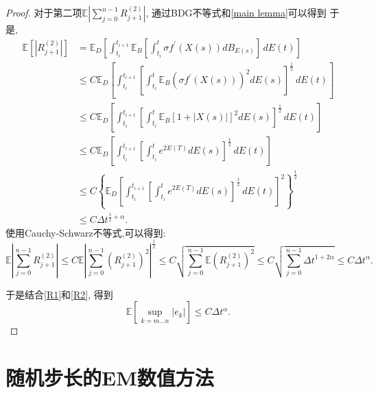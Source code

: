 \begin{proof}
	对于第二项$\mathbb{E}|\sum\limits_{j=0}^{n-1}R_{j+1}^{(2)}|$, 
	通过BDG不等式和\cref{main lemma}可以得到
	于是, 
	\begin{align*}
		\mathbb{E} \left[|R_{j+1}^{(2)}| \right] &= \mathbb{E}_D \left[
		\int_{t_i}^{t_{i+1}} \mathbb{E}_B  \left[\int_{t_i}^{t}  \sigma f^{\prime}(X(s)) dB_{E(s)}\right] \, dE(t)
		\right] \\
		& \le C\mathbb{E}_D \left[
		\int_{t_i}^{t_{i+1}} \left[\int_{t_i}^{t}  \mathbb{E}_B\left(\sigma f^{\prime}(X(s))\right)^2 dE(s)\right]^{\frac{1}{2}} \, dE(t)
		\right] \\
		& \le C\mathbb{E}_D \left[
		\int_{t_i}^{t_{i+1}} \left[\int_{t_i}^{t}  	\mathbb{E}_B \left[1+|X(s)|\right]^2 dE(s)\right]^{\frac{1}{2}} \, dE(t)
		\right] \\
		&\le C \mathbb{E}_D \left[
		\int_{t_i}^{t_{i+1}} \left[\int_{t_i}^{t}  e^{2E(T)} dE(s)\right]^{\frac{1}{2}} \, dE(t)\right]\\
		&\le C \left\{\mathbb{E}_D \left[
		\int_{t_i}^{t_{i+1}} \left[\int_{t_i}^{t}  e^{2E(T)} dE(s)\right]^{\frac{1}{2}} \, dE(t)\right]^2\right\}^{\frac{1}{2}}\\
		&\le C\Delta t^{\frac{1}{2}+\alpha}. 
	\end{align*}
	使用Cauchy-Schwarz不等式,可以得到:
	\begin{equation}\label{R2}
		\mathbb{E}\left|\sum_{j=0}^{n-1}R_{j+1}^{(2)}\right|  \le C\mathbb{E} \left|\sum_{j=0}^{n-1}(R_{j+1}^{(2)})^2\right|^{\frac{1}{2}} \le C\sqrt{\sum_{j=0}^{n-1}\mathbb{E}(R_{j+1}^{(2)})^2}
		\le C\sqrt{\sum_{j=0}^{n-1}\Delta t^{1+2\alpha}} \le C\Delta t^{\alpha}. 
	\end{equation}
	
	于是结合\cref{R1}和\cref{R2}, 得到
	$$\mathbb{E}\left[\sup\limits_{k=m \ldots n}\left|e_k\right|\right] \leq C\Delta t^\alpha. $$
\end{proof}


	
\section{随机步长的EM数值方法}

